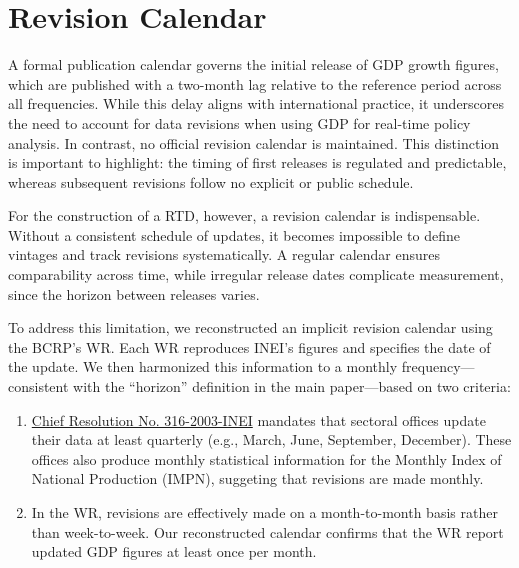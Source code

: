 \documentclass[a4paper, fleqn, 11pt]{article}
\begin{document}
\section{Revision Calendar}
\label{section:calendar}

A formal publication calendar governs the initial release of GDP growth figures, which are published with a two-month lag relative to the reference period across all frequencies. While this delay aligns with international practice, it underscores the need to account for data revisions when using GDP for real-time policy analysis. In contrast, no official revision calendar is maintained. This distinction is important to highlight: the timing of first releases is regulated and predictable, whereas subsequent revisions follow no explicit or public schedule.

For the construction of a RTD, however, a revision calendar is indispensable. Without a consistent schedule of updates, it becomes impossible to define vintages and track revisions systematically. A regular calendar ensures comparability across time, while irregular release dates complicate measurement, since the horizon between releases varies.

To address this limitation, we reconstructed an implicit revision calendar using the BCRP's WR. Each WR reproduces INEI's figures and specifies the date of the update. We then harmonized this information to a monthly frequency—consistent with the ``horizon'' definition in the main paper—based on two criteria:

\begin{enumerate}
    \item \href{https://www.gob.pe/institucion/inei/normas-legales/2294897-316-2003-inei}{Chief Resolution No. 316-2003-INEI} mandates that sectoral offices update their data at least quarterly (e.g., March, June, September, December). These offices also produce monthly statistical information for the Monthly Index of National Production (IMPN), suggeting that revisions are made monthly.

    \item In the WR, revisions are effectively made on a month-to-month basis rather than week-to-week. Our reconstructed calendar confirms that the WR report updated GDP figures at least once per month.
\end{enumerate}

\end{document}
